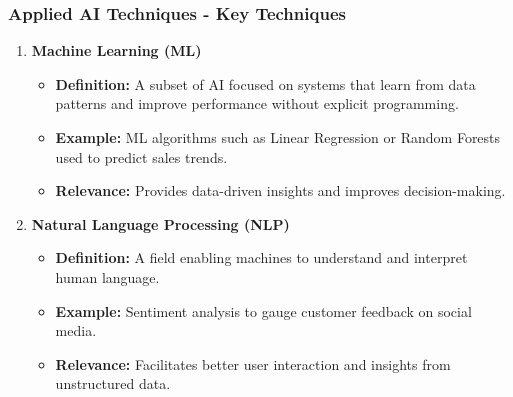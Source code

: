 \documentclass[aspectratio=169]{beamer}
\begin{document}
\begin{frame}[fragile]
    \frametitle{Applied AI Techniques - Key Techniques}
    \begin{enumerate}
        \item \textbf{Machine Learning (ML)}
        \begin{itemize}
            \item \textbf{Definition:} A subset of AI focused on systems that learn from data patterns and improve performance without explicit programming.
            \item \textbf{Example:} ML algorithms such as Linear Regression or Random Forests used to predict sales trends.
            \item \textbf{Relevance:} Provides data-driven insights and improves decision-making.
        \end{itemize}

        \item \textbf{Natural Language Processing (NLP)}
        \begin{itemize}
            \item \textbf{Definition:} A field enabling machines to understand and interpret human language.
            \item \textbf{Example:} Sentiment analysis to gauge customer feedback on social media.
            \item \textbf{Relevance:} Facilitates better user interaction and insights from unstructured data.
        \end{itemize}
    \end{enumerate}
\end{frame}
\end{document}
